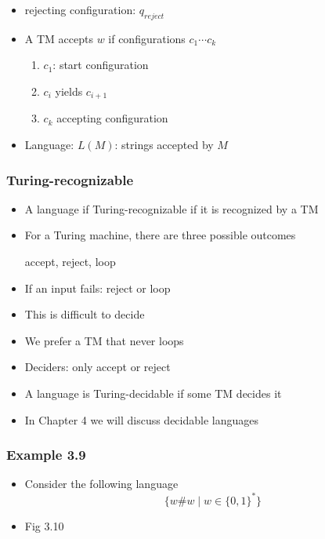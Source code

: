 \begin{frame}[allowframebreaks]
\begin{itemize}
\item rejecting configuration: $q_{reject}$
\item A TM accepts $w$ if configurations 
$c_1 \cdots c_k$
\begin{enumerate}
\item $c_1$: start configuration
\item $c_i$ yields $c_{i+1}$
\item $c_k$ accepting configuration
\end{enumerate}
\item Language: $L(M)$: strings accepted by $M$

\end{itemize}\end{frame} \begin{frame}[allowframebreaks] \frametitle{Turing-recognizable}
  \begin{itemize}
\item A language if Turing-recognizable if it is recognized by a TM
\item For a Turing machine, there are three possible outcomes
  \begin{center}
accept, reject, loop
\end{center}
\item If an input fails: reject or loop

\item [] This is difficult to decide
\item We prefer a TM that never loops

\item [] Deciders: only accept or reject
\item A language is Turing-decidable if some TM decides it
\item In Chapter 4 we will discuss decidable languages
  
\end{itemize}\end{frame} \begin{frame}[allowframebreaks] \frametitle{Example 3.9}
  \begin{itemize}
  \item Consider the following language
    \begin{equation*}
    \{w\# w\mid w\in \{0,1\}^*\}
  \end{equation*}

\item Fig 3.10  
 
\end{itemize}


\end{frame}
